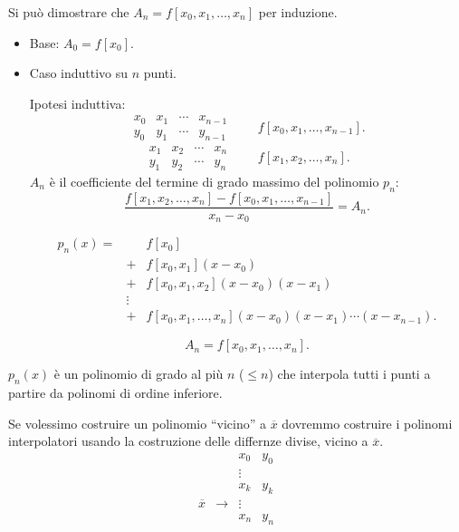 Si può dimostrare che $A_n = f[x_0,x_1,\ldots,x_n]$ per induzione.

\begin{dimo}
\begin{itemize}
\item[]Base: $A_0 = f[x_0].$
\item[]Caso induttivo su $n$ punti.
\begin{flushleft}
Ipotesi induttiva:
\[
\begin{array}{cccc}
x_0 & x_1 & \cdots  & x_{n-1}\\
y_0 & y_1 & \cdots  & y_{n-1}
\end{array} \qquad f[x_0,x_1,\ldots,x_{n-1}].
\]
\[
\begin{array}{cccc}
x_1 & x_2 & \cdots  & x_n\\
y_1 & y_2 & \cdots  & y_n
\end{array} \qquad f[x_1,x_2,\ldots,x_n].
\]
$A_n$ è il coefficiente del termine di grado massimo del polinomio $p_n$:
\[
\frac{f[x_1,x_2,\ldots,x_n]-f[x_0,x_1,\ldots,x_{n-1}]}{x_n-x_0} = A_n.
\]

\[
\begin{array}{lcl}
p_n(x) = &   & f[x_0] \\
         & + & f[x_0,x_1](x-x_0) \\
         & + & f[x_0,x_1,x_2](x-x_0)(x-x_1) \\
         & \vdots & \\
         & + & f[x_0,x_1,\ldots,x_n](x-x_0)(x-x_1)\cdots(x-x_{n-1}).
\end{array}\]

\[
A_n = f[x_0,x_1,\ldots,x_n].
\]
\end{flushleft}
\end{itemize}
$p_n(x)$ è un polinomio di grado al più $n$ ($\leq n$) che interpola tutti i
punti a partire da polinomi di ordine inferiore.
\end{dimo}

Se volessimo costruire un polinomio ``vicino'' a $\overline{x}$ dovremmo
costruire i polinomi interpolatori usando la costruzione delle differnze
divise, vicino a $\overline{x}$.
\[\begin{array}{cccc}
 & & x_0 & y_0 \\
 & & \vdots & \\
 & & x_k & y_k \\
\overline{x}& \rightarrow & \vdots & \\
 & & x_n & y_n
\end{array}\]

